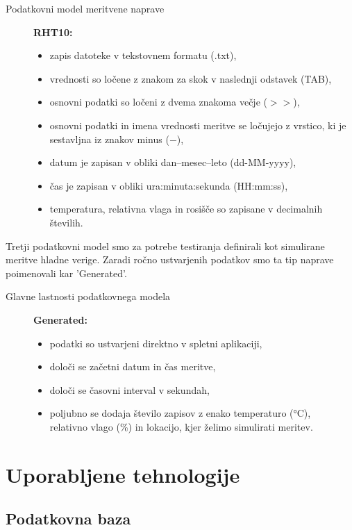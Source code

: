 \documentclass[a4paper, 12pt]{book}
\begin{document}
\begin{description}
\item[Podatkovni model meritvene naprave]\textbf{RHT10:}
\begin{itemize}
\item zapis datoteke v tekstovnem formatu (.txt),
\item vrednosti so ločene z znakom za skok v naslednji odstavek (TAB),
\item osnovni podatki so ločeni z dvema znakoma večje ($>>$),
\item osnovni podatki in imena vrednosti meritve se ločujejo z vrstico, ki je sestavljna iz znakov minus ($-$),
\item datum je zapisan v obliki dan--mesec--leto (dd-MM-yyyy),
\item čas je zapisan v obliki ura:minuta:sekunda (HH:mm:ss),
\item temperatura, relativna vlaga in rosišče so zapisane v decimalnih številih.
\end{itemize}
\end{description}


\noindent Tretji podatkovni model smo za potrebe testiranja definirali kot simulirane meritve hladne verige. Zaradi ročno ustvarjenih podatkov smo ta tip naprave poimenovali kar 'Generated'.


\begin{description}
\item[Glavne lastnosti podatkovnega modela]\textbf{Generated:}
\begin{itemize}
\item podatki so ustvarjeni direktno v spletni aplikaciji,
\item določi se začetni datum in čas meritve,
\item določi se časovni interval v sekundah,
\item poljubno se dodaja število zapisov z enako temperaturo (°C), \\ relativno vlago (\%) in lokacijo, kjer želimo simulirati meritev.
\end{itemize}
\end{description}

\chapter{Uporabljene tehnologije}
\label{uporabljene-tehnologije}



\section{Podatkovna baza}
\end{document}
